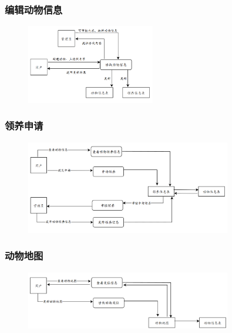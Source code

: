 \documentclass[12pt,a4paper,UTF8]{article}
\begin{document}
\subsubsection{编辑动物信息}

\begin{figure}[H]
  \centering
  \includegraphics[width=0.5\textwidth]{figures/df33.png}
\end{figure}

\subsubsection{领养申请}

\begin{figure}[H]
  \centering
  \includegraphics[width=0.8\textwidth]{figures/df34.png}
\end{figure}

\subsubsection{动物地图}

\begin{figure}[H]
  \centering
  \includegraphics[width=0.8\textwidth]{figures/df35.png}
\end{figure}
\end{document}
